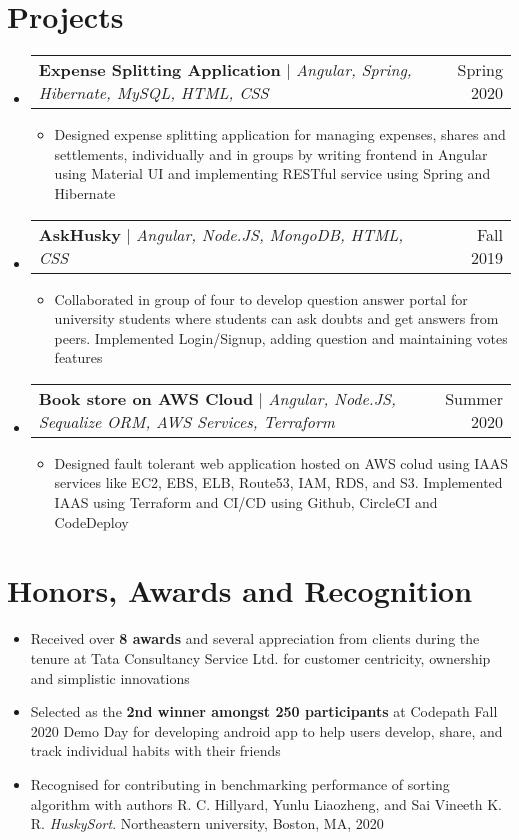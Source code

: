 \documentclass[letterpaper,11pt]{article}
\makeatletter
\newcommand{\resumeItem}[1]{
  \item\small{
    {#1 \vspace{-2pt}}
  }
}
\newcommand{\resumeProjectHeading}[2]{
    \item
    \begin{tabular*}{0.97\textwidth}{l@{\extracolsep{\fill}}r}
      \small#1 & #2 \\
    \end{tabular*}\vspace{-7pt}
}
\newcommand{\resumeSubHeadingListStart}{\begin{itemize}[leftmargin=0.15in, label={}]}
\newcommand{\resumeSubHeadingListEnd}{\end{itemize}}
\newcommand{\resumeItemListStart}{\begin{itemize}}
\newcommand{\resumeItemListEnd}{\end{itemize}\vspace{-5pt}}
\makeatother
\begin{document}
\section{Projects}
    \resumeSubHeadingListStart
      \resumeProjectHeading
          {\textbf{Expense Splitting Application} $|$ \emph{Angular, Spring, Hibernate, MySQL, HTML, CSS}}{Spring 2020}
          \resumeItemListStart
            \resumeItem{Designed expense splitting application for managing expenses,  shares and settlements, individually and in groups by writing frontend in Angular using Material UI and implementing RESTful service using Spring and Hibernate}
          \resumeItemListEnd
      \resumeProjectHeading
          {\textbf{AskHusky} $|$ \emph{Angular, Node.JS, MongoDB, HTML, CSS}}{Fall 2019}
          \resumeItemListStart
            \resumeItem{Collaborated in group of four to develop question answer portal for university students where students can ask doubts and get answers from peers. Implemented Login/Signup, adding question and maintaining votes features}
          \resumeItemListEnd
          
        \resumeProjectHeading
          {\textbf{Book store on AWS Cloud} $|$ \emph{Angular, Node.JS, Sequalize ORM, AWS Services, Terraform}}{Summer 2020}
          \resumeItemListStart
            \resumeItem{Designed fault tolerant web application hosted on AWS colud using IAAS services like EC2, EBS, ELB, Route53, IAM, RDS, and S3. Implemented IAAS using Terraform and CI/CD using Github, CircleCI and CodeDeploy}
          \resumeItemListEnd  
          
    \resumeSubHeadingListEnd

\section{Honors, Awards and Recognition}
    \resumeItemListStart
        \resumeItem{Received over \textbf{8 awards} and several appreciation from clients during the tenure at Tata Consultancy Service Ltd. for customer centricity, ownership and simplistic innovations}
        \resumeItem{Selected as the \textbf{2nd winner amongst 250 participants} at Codepath Fall 2020 Demo Day for developing android app to help users develop, share, and track individual habits with their friends}
        \resumeItem{Recognised for contributing in benchmarking performance of sorting algorithm with authors R. C. Hillyard, Yunlu Liaozheng, and Sai Vineeth K. R. 
        \textit{HuskySort}. 
        Northeastern university, Boston, MA, 2020
        }
    \resumeItemListEnd    


\end{document}
